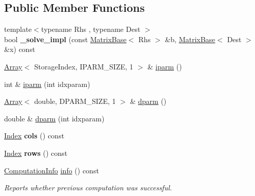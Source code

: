 \subsection*{Public Member Functions}
\begin{DoxyCompactItemize}
\item 
\mbox{\label{class_eigen_1_1_pastix_base_a63c39ad03354e57b4ea67683dead4674}} 
{\footnotesize template$<$typename Rhs , typename Dest $>$ }\\bool {\bfseries \+\_\+solve\+\_\+impl} (const \hyperlink{group___core___module_class_eigen_1_1_matrix_base}{Matrix\+Base}$<$ Rhs $>$ \&b, \hyperlink{group___core___module_class_eigen_1_1_matrix_base}{Matrix\+Base}$<$ Dest $>$ \&x) const
\item 
\hyperlink{group___core___module_class_eigen_1_1_array}{Array}$<$ Storage\+Index, I\+P\+A\+R\+M\+\_\+\+S\+I\+ZE, 1 $>$ \& \hyperlink{class_eigen_1_1_pastix_base_a38378e7b2b5c750a8a23e2c21a69146c}{iparm} ()
\item 
int \& \hyperlink{class_eigen_1_1_pastix_base_a5509ca8d6a9217fb95ab020363b9e0fb}{iparm} (int idxparam)
\item 
\hyperlink{group___core___module_class_eigen_1_1_array}{Array}$<$ double, D\+P\+A\+R\+M\+\_\+\+S\+I\+ZE, 1 $>$ \& \hyperlink{class_eigen_1_1_pastix_base_af4a29373aa3e6a980738efde33f92a76}{dparm} ()
\item 
double \& \hyperlink{class_eigen_1_1_pastix_base_a6e7baecd4990d6df9b5713cb6499e940}{dparm} (int idxparam)
\item 
\mbox{\label{class_eigen_1_1_pastix_base_a6ba5c02c8b13ad144a96f9fb6a5885e5}} 
\hyperlink{namespace_eigen_a62e77e0933482dafde8fe197d9a2cfde}{Index} {\bfseries cols} () const
\item 
\mbox{\label{class_eigen_1_1_pastix_base_a01b3786f9c460d32284fe63655f29109}} 
\hyperlink{namespace_eigen_a62e77e0933482dafde8fe197d9a2cfde}{Index} {\bfseries rows} () const
\item 
\hyperlink{group__enums_ga85fad7b87587764e5cf6b513a9e0ee5e}{Computation\+Info} \hyperlink{class_eigen_1_1_pastix_base_a436e99a385c9c019be9627cc1fa884cf}{info} () const
\begin{DoxyCompactList}\small\item\em Reports whether previous computation was successful. \end{DoxyCompactList}\item 

\end{DoxyCompactItemize}
